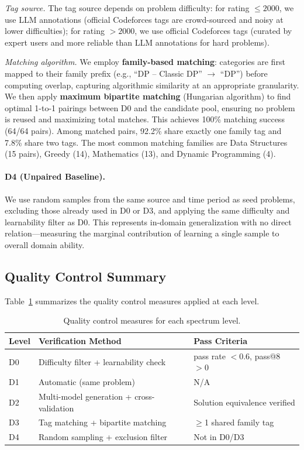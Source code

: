 \documentclass[]{bytedance_seed}
\theoremstyle{plain}
\theoremstyle{definition}
\theoremstyle{remark}
\begin{document}
\textit{Tag source.}
The tag source depends on problem difficulty: for rating $\leq 2000$, we use LLM annotations (official Codeforces tags are crowd-sourced and noisy at lower difficulties); for rating $> 2000$, we use official Codeforces tags (curated by expert users and more reliable than LLM annotations for hard problems).

\textit{Matching algorithm.}
We employ \textbf{family-based matching}: categories are first mapped to their family prefix (e.g., ``DP -- Classic DP'' $\to$ ``DP'') before computing overlap, capturing algorithmic similarity at an appropriate granularity. We then apply \textbf{maximum bipartite matching} (Hungarian algorithm) to find optimal 1-to-1 pairings between D0 and the candidate pool, ensuring no problem is reused and maximizing total matches. This achieves 100\% matching success (64/64 pairs). Among matched pairs, 92.2\% share exactly one family tag and 7.8\% share two tags. The most common matching families are Data Structures (15 pairs), Greedy (14), Mathematics (13), and Dynamic Programming (4).

\paragraph{D4 (Unpaired Baseline).}
We use random samples from the same source and time period as seed problems, excluding those already used in D0 or D3, and applying the same difficulty and learnability filter as D0. This represents in-domain generalization with no direct relation---measuring the marginal contribution of learning a single sample to overall domain ability.

\subsection{Quality Control Summary}
\label{app:quality-control}

Table~\ref{tab:quality-control} summarizes the quality control measures applied at each level.

\begin{table}[h]
\centering
\small
\caption{Quality control measures for each spectrum level.}
\label{tab:quality-control}
\begin{tabular}{lll}
\toprule
\textbf{Level} & \textbf{Verification Method} & \textbf{Pass Criteria} \\
\midrule
D0 & Difficulty filter + learnability check & pass rate $<0.6$, pass@8 $>0$ \\
D1 & Automatic (same problem) & N/A \\
D2 & Multi-model generation + cross-validation & Solution equivalence verified \\
D3 & Tag matching + bipartite matching & $\geq$1 shared family tag \\
D4 & Random sampling + exclusion filter & Not in D0/D3 \\
\bottomrule
\end{tabular}
\end{table}
\end{document}
